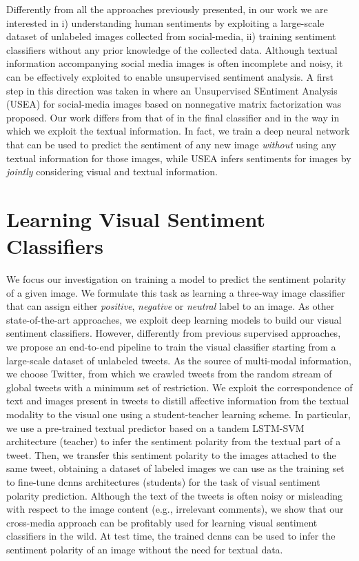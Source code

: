 Differently from all the approaches previously presented, in our work we are interested in i) understanding human sentiments by exploiting a large-scale dataset of unlabeled images collected from social-media, ii) training sentiment classifiers without any prior knowledge of the collected data.
Although textual information accompanying social media images is often incomplete and noisy, it can be effectively exploited to enable unsupervised sentiment analysis.
A first step in this direction was taken in \cite{wang2015unsupervised} where an Unsupervised SEntiment Analysis (USEA) for social-media images based on nonnegative matrix factorization was proposed.
Our work differs from that of \citet{wang2015unsupervised} in the final classifier and in the way in which we exploit the textual information.
In fact, we train a deep neural network that can be used to predict the sentiment of any new image \emph{without} using any textual information for those images, while USEA infers sentiments for images by \emph{jointly} considering visual and textual information.


\section{Learning Visual Sentiment Classifiers}

We focus our investigation on training a model to predict the sentiment polarity of a given image.
We formulate this task as learning a three-way image classifier that can assign either \emph{positive}, \emph{negative} or \emph{neutral} label to an image.
As other state-of-the-art approaches, we exploit deep learning models to build our visual sentiment classifiers.
However, differently from previous supervised approaches, we propose an end-to-end pipeline to train the visual classifier starting from a large-scale dataset of unlabeled tweets.
As the source of multi-modal information, we choose Twitter, from which we crawled tweets from the random stream of global tweets with a minimum set of restriction.
We exploit the correspondence of text and images present in tweets to distill affective information from the textual modality to the visual one using a student-teacher learning scheme.
In particular, we use a pre-trained textual predictor based on a tandem \gls{LSTM}-\gls{SVM} architecture (teacher) to infer the sentiment polarity from the textual part of a tweet.
Then, we transfer this sentiment polarity to the images attached to the same tweet, obtaining a dataset of labeled images we can use as the training set to fine-tune \glspl{dcnn} architectures (students) for the task of visual sentiment polarity prediction.
Although the text of the tweets is often noisy or misleading with respect to the image content (e.g., irrelevant comments), we show that our cross-media approach can be profitably used for learning visual sentiment classifiers in the wild.
At test time, the trained \glspl{dcnn} can be used to infer the sentiment polarity of an image without the need for textual data.

